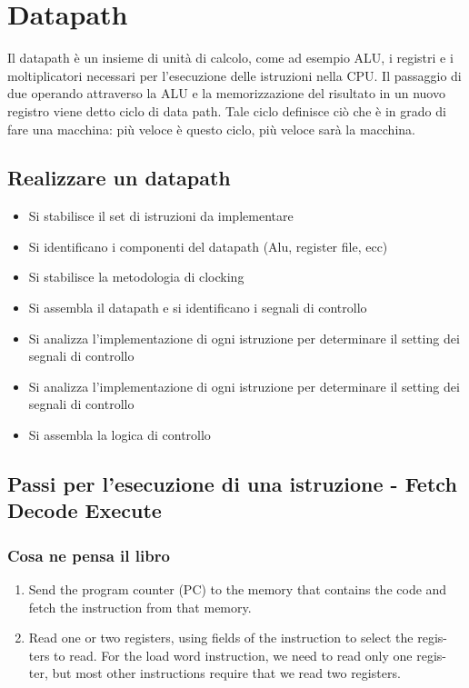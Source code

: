 \documentclass[12pt, a4paper, openany]{book}
\begin{document}
\chapter{Datapath}
Il datapath è un insieme di unità di calcolo, come ad esempio
ALU, i registri e i moltiplicatori necessari per l'esecuzione delle istruzioni nella
CPU.
Il passaggio di due operando attraverso la ALU e la memorizzazione del risultato in un
nuovo registro viene detto ciclo di data path. Tale ciclo definisce ciò che è in grado
di fare una macchina: più veloce è questo ciclo, più veloce sarà la macchina.

\section{Realizzare un datapath}
\begin{itemize}
    \item Si stabilisce il set di istruzioni da implementare
    \item Si identificano i componenti del datapath (Alu, register file, ecc)
    \item Si stabilisce la metodologia di clocking
    \item Si assembla il datapath e si identificano i segnali di controllo
    \item Si analizza l'implementazione di ogni istruzione per determinare il setting
    dei segnali di controllo
    \item Si analizza l'implementazione di ogni istruzione per determinare il setting
    dei segnali di controllo
    \item Si assembla la logica di controllo
\end{itemize}

\section{Passi per l'esecuzione di una istruzione - Fetch Decode Execute}
\subsection*{Cosa ne pensa il libro}
\begin{enumerate}
    \item Send the program counter (PC) to the memory that contains the code and
    fetch the instruction from that memory.
    \item Read one or two registers, using fields of the instruction to select the regis-
    ters to read. For the load word instruction, we need to read only one regis-
    ter, but most other instructions require that we read two registers.    
\end{enumerate}
\end{document}
